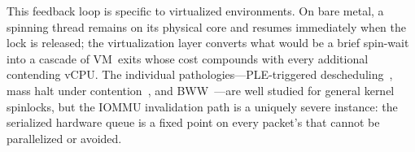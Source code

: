 This feedback loop is specific to virtualized environments.
On bare metal, a spinning thread remains on its physical
  core and resumes immediately when the lock is released;
  the virtualization layer converts what would be a brief
  spin-wait into a cascade of VM~exits whose cost compounds
  with every additional contending vCPU.
The individual pathologies---PLE-triggered 
  descheduling~\cite{Shan2017apples}, 
  mass halt under contention~\cite{Kashyap2016oppspinlocks}, 
  and BWW~\cite{Ding2014gleaner, Kashyap2018ecs}---are well studied
  for general kernel spinlocks,
  but the IOMMU invalidation path is a uniquely severe instance:
  the serialized hardware queue is a fixed point
  on every packet's  that cannot be
  parallelized or avoided.


 
